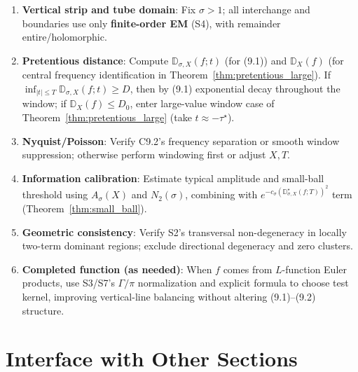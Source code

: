 \documentclass[11pt,a4paper]{article}
\theoremstyle{remark}
\begin{document}
\begin{enumerate}
\item \textbf{Vertical strip and tube domain}: Fix $\sigma>1$; all interchange and boundaries use only \textbf{finite-order EM} (S4), with remainder entire/holomorphic.

\item \textbf{Pretentious distance}: Compute $\mathbb{D}_{\sigma,X}(f;t)$ (for (9.1)) and $\mathbb{D}_X(f)$ (for central frequency identification in Theorem~\ref{thm:pretentious_large}). If $\displaystyle \inf_{|t|\le T}\mathbb{D}_{\sigma,X}(f;t)\ge D$, then by (9.1) exponential decay throughout the window; if $\mathbb{D}_X(f)\le D_0$, enter large-value window case of Theorem~\ref{thm:pretentious_large} (take $t\approx-\tau^\star$).

\item \textbf{Nyquist/Poisson}: Verify C9.2's frequency separation or smooth window suppression; otherwise perform windowing first or adjust $X,T$.

\item \textbf{Information calibration}: Estimate typical amplitude and small-ball threshold using $A_\sigma(X)$ and $N_2(\sigma)$, combining with $e^{-c_\sigma(\mathbb{D}^{\star}_{\sigma,X}(f;T))^2}$ term (Theorem~\ref{thm:small_ball}).

\item \textbf{Geometric consistency}: Verify S2's transversal non-degeneracy in locally two-term dominant regions; exclude directional degeneracy and zero clusters.

\item \textbf{Completed function (as needed)}: When $f$ comes from $L$-function Euler products, use S3/S7's $\Gamma/\pi$ normalization and explicit formula to choose test kernel, improving vertical-line balancing without altering (9.1)--(9.2) structure.
\end{enumerate}

\section{Interface with Other Sections}
\end{document}
